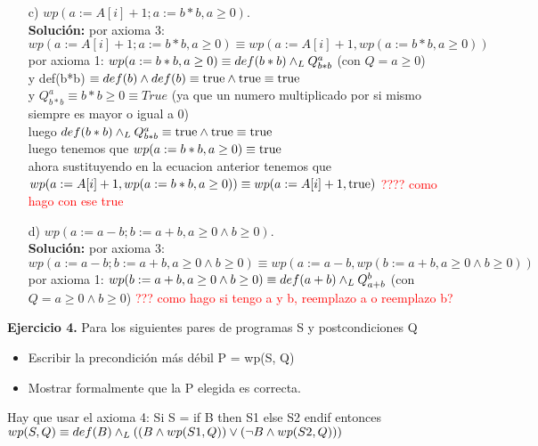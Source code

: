 \documentclass{article}
\begin{document}
\begin{itemize}
	\item [c)] $wp(a := A[i] + 1; a := b*b, a \geq 0)$.\\
	\textbf{Soluci\'on:}
	por axioma 3: $wp(a := A[i] + 1; a := b*b, a \geq 0) \equiv wp(a := A[i] + 1, wp(a := b*b, a \geq 0))$\\
	por axioma 1: $wp(a := b*b, a \geq 0) \equiv def(b*b) \land _L Q^{a}_{b*b}$ (con $Q = a \geq 0$)\\
	y def(b*b) $\equiv def(b) \land def(b) \equiv \mathrm{true} \land \mathrm{true} \equiv \mathrm{true}$\\
	y $Q^{a}_{b*b} \equiv b*b \geq 0 \equiv True$ (ya que un numero multiplicado por si mismo siempre es mayor o igual a 0)\\
	luego $def(b*b) \land _L Q^{a}_{b*b} \equiv \mathrm{true} \land \mathrm{true} \equiv \mathrm{true}$\\
	luego tenemos que $wp(a := b*b, a \geq 0) \equiv \mathrm{true}$\\
	ahora sustituyendo en la ecuacion anterior tenemos que $wp(a := A[i] + 1, wp(a := b*b, a \geq 0)) \equiv wp(a := A[i] + 1, \mathrm{true})$ \textcolor{red}{???? como hago con ese true}\\

	\item [d)] $wp(a := a-b; b := a+b, a \geq 0 \land b \geq 0)$.\\
	\textbf{Soluci\'on:}
	por axioma 3: $wp(a := a-b; b := a+b, a \geq 0 \land b \geq 0) \equiv wp(a := a-b, wp(b := a+b, a \geq 0 \land b \geq 0))$\\
	por axioma 1: $wp(b := a+b, a \geq 0 \land b \geq 0) \equiv def(a+b) \land _L Q^{b}_{a+b}$ (con $Q = a \geq 0 \land b \geq 0$) \textcolor{red}{??? como hago si tengo a y b, reemplazo  a o reemplazo  b?}\\
\end{itemize}

\textbf{Ejercicio 4.} Para los siguientes pares de programas S y postcondiciones Q
\begin{itemize}
	\item Escribir la precondici\'on m\'as d\'ebil P = wp(S, Q)
	\item Mostrar formalmente que la P elegida es correcta.
\end{itemize}
Hay que usar el axioma 4: Si S = if B then S1 else S2 endif entonces $wp(S,Q) \equiv def(B) \land _L ((B \land wp(S1,Q)) \lor (\lnot B \land wp(S2, Q)))$
\end{document}
